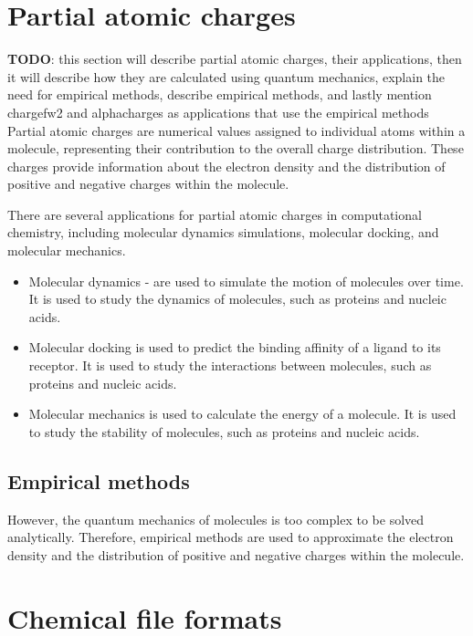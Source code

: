 \documentclass[
  digital,     %
  oneside,     %
  nosansbold,  %
  nocolorbold, %
  lof,         %
  lot,         %
]{fithesis4}
\begin{document}
\section{Partial atomic charges}
\label{section:partial_atomic_charges}

\textbf{TODO}: this section will describe partial atomic charges, their applications, then it will describe how they are calculated using quantum mechanics, explain the need for empirical methods, describe empirical methods, and lastly mention chargefw2 and alphacharges as applications that use the empirical methods \\

Partial atomic charges are numerical values assigned to individual atoms within a molecule, representing their contribution to the overall charge distribution. These charges provide information about the electron density and the distribution of positive and negative charges within the molecule.

There are several applications for partial atomic charges in computational chemistry, including molecular dynamics simulations, molecular docking, and molecular mechanics.

\begin{itemize}
  \item Molecular dynamics - are used to simulate the motion of molecules over time. It is used to study the dynamics of molecules, such as proteins and nucleic acids.
  \item Molecular docking is used to predict the binding affinity of a ligand to its receptor. It is used to study the interactions between molecules, such as proteins and nucleic acids.
  \item Molecular mechanics is used to calculate the energy of a molecule. It is used to study the stability of molecules, such as proteins and nucleic acids.
\end{itemize}

\subsection{Empirical methods}

However, the quantum mechanics of molecules is too complex to be solved analytically. Therefore, empirical methods are used to approximate the electron density and the distribution of positive and negative charges within the molecule.

\section{Chemical file formats}
\label{section:chemical_file_formats}
\end{document}
